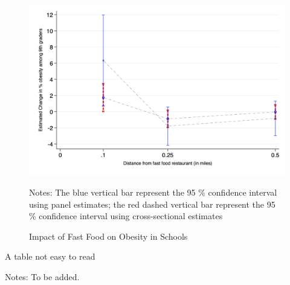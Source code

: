 \documentclass[11pt]{article}
\begin{document}
\begin{figure}[H]
\vspace{0.5cm}
\begin{center}
\caption{\label{fig: obes_schools} Impact of Fast Food on Obesity in Schools}
\includegraphics[width=130 mm, height=90 mm]{../figures/figure1A.png} 
\end{center}
\vspace{-0.3cm}
\par
\begin{minipage}{ \linewidth}
\scriptsize{Notes: The blue vertical bar represent the 95 \% confidence interval using panel estimates; the red dashed vertical bar represent the 95 \% confidence interval using cross-sectional estimates}
\end{minipage}

\end{figure}


\begin{table}[H]

\caption{\label{fig: low_readability} A table not easy to read}
\vspace{-0.3cm}
\begin{center}




\vspace{-0.3cm}
\end{center}

\par
\begin{minipage}{ \linewidth}
\scriptsize{Notes: To be added.}
\end{minipage}
\end{table}
\end{document}
